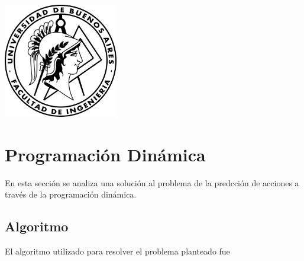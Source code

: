 \documentclass[a4paper, 10pt]{article}
\newcommand\tab[1][0.5cm]{\hspace*{#1}}
\begin{document}
    \newpage

    \begin{center}
        \includegraphics[width=5cm, height=5cm]{images/logo}
    \end{center}


    \maketitle
    \newpage
    \tableofcontents
    \newpage

    \section{Programación Dinámica}
        \tab En esta sección se analiza una solución al problema de la predcción de acciones a través
        de la programación dinámica.
        \subsection{Algoritmo}
            \tab El algoritmo utilizado para resolver el problema planteado fue %
\end{document}
